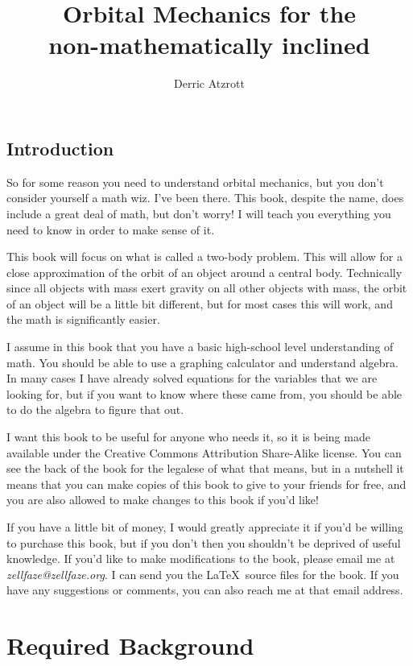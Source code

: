 \documentclass[]{book}
\title{Orbital Mechanics for the\\ non-mathematically inclined}
\author{Derric Atzrott}
\begin{document}
\maketitle

\tableofcontents

\chapter{Introduction}

So for some reason you need to understand orbital mechanics, but you don't
consider yourself a math wiz.  I've been there.  This book, despite the
name, does include a great deal of math, but don't worry! I will teach
you everything you need to know in order to make sense of it.

This book will focus on what is called a two-body problem. This will
allow for a close approximation of the orbit of an object around a central
body. Technically since all objects with mass exert gravity on all other
objects with mass, the orbit of an object will be a little bit different,
but for most cases this will work, and the math is significantly easier.

I assume in this book that you have a basic high-school level understanding
of math.  You should be able to use a graphing calculator and understand
algebra.  In many cases I have already solved equations for the variables
that we are looking for, but if you want to know where these came from,
you should be able to do the algebra to figure that out.

I want this book to be useful for anyone who needs it, so it is being
made available under the Creative Commons Attribution Share-Alike license.
You can see the back of the book for the legalese of what that means, but
in a nutshell it means that you can make copies of this book to give to
your friends for free, and you are also allowed to make changes to this
book if you'd like!

If you have a little bit of money, I would greatly appreciate it if you'd
be willing to purchase this book, but if you don't then you shouldn't be
deprived of useful knowledge.  If you'd like to make modifications to the
book, please email me at \textit{zellfaze@zellfaze.org}.  I can send you
the \LaTeX\ source files for the book.  If you have any suggestions or
comments, you can also reach me at that email address.

\part{Required Background}
\end{document}
